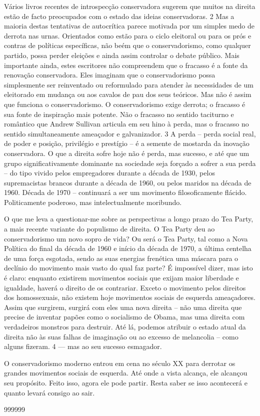 Vários livros recentes de introspecção conservadora sugerem que muitos na direita estão de facto preocupados com o estado das ideias conservadoras.
 {\color{blue} 2}  
Mas a maioria destas tentativas de autocrítica parece motivada por um simples medo de derrota nas urnas. Orientados como estão para o ciclo eleitoral ou para os prós e contras de políticas específicas, não beém que o conservadorismo, como qualquer partido, possa perder eleições e ainda assim controlar o debate público. Mais importante ainda, estes escritores não compreendem que o fracasso é a fonte da renovação conservadora. Eles imaginam que o conservadorismo possa simplesmente ser reinventado ou reformulado para atender às necessidades de um eleitorado em mudança ou aos cavalos de pau dos seus teóricos. Mas não é assim que funciona o conservadorismo. O conservadorismo exige derrota; o fracasso é sua fonte de inspiração mais potente. Não o fracasso no sentido taciturno e romântico que Andrew Sullivan articula em seu hino à perda, mas o fracasso no sentido simultaneamente ameaçador e galvanizador.
 {\color{blue} 3}  
A perda – perda social real, de poder e posição, privilégio e prestígio – é a semente de mostarda da inovação conservadora. O que a direita sofre hoje não é perda, mas sucesso, e até que um grupo significativamente dominante na sociedade seja forçado a sofrer a sua perda – do tipo vivido pelos empregadores durante a década de 1930, pelos supremacistas brancos durante a década de 1960, ou pelos maridos na década de 1960. Década de 1970 – continuará a ser um movimento filosoficamente flácido. Politicamente poderoso, mas intelectualmente moribundo.
 
\par
 
O que me leva a questionar-me sobre as perspectivas a longo prazo do Tea Party, a mais recente variante do populismo de direita. O Tea Party deu ao conservadorismo um novo sopro de vida? Ou será o Tea Party, tal como a Nova Política do final da década de 1960 e início da década de 1970, a última centelha de uma força esgotada, sendo as suas energias frenética uma máscara para o declínio do movimento mais vasto do qual faz parte? É impossível dizer, mas isto é claro: enquanto existirem movimentos sociais que exijam maior liberdade e igualdade, haverá o direito de os contrariar. Exceto o movimento pelos direitos dos homossexuais, não existem hoje movimentos sociais de esquerda ameaçadores. Assim que surgirem, surgirá com eles uma nova direita – não uma direita que precise de inventar papões como o socialismo de Obama, mas uma direita com verdadeiros monstros para destruir. Até lá, podemos atribuir o estado atual da direita não às suas falhas de imaginação ou ao excesso de melancolia – como alguns fizeram.
 {\color{blue} 4}  
— mas ao seu sucesso esmagador.
 
\par
 
O conservadorismo moderno entrou em cena no século XX para derrotar os grandes movimentos sociais de esquerda. Até onde a vista alcança, ele alcançou seu propósito. Feito isso, agora ele pode partir. Resta saber se isso acontecerá e quanto levará consigo ao sair.
 
\par
  
 
999999
